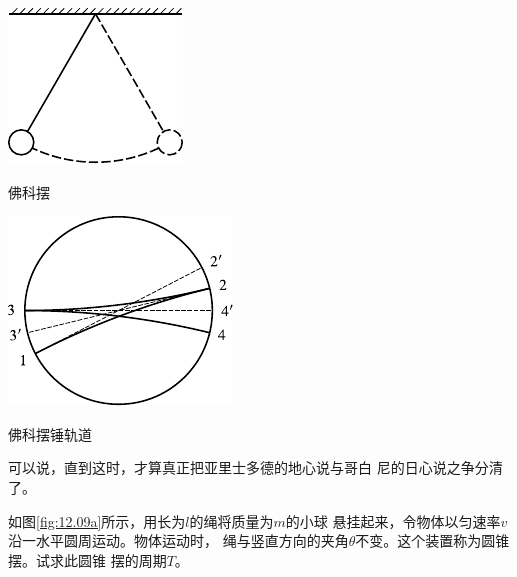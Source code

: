 \begin{figurex}[h]
    \begin{minipage}[b]{0.5\linewidth}
        \centering
        \includegraphics{figure/fig12.07}
        \caption{佛科摆}
        \label{fig:12.07}
    \end{minipage}
    \begin{minipage}[b]{0.5\linewidth}
        \centering
        \includegraphics{figure/fig12.08}
        \caption{佛科摆锤轨道}
        \label{fig:12.08}
    \end{minipage}
\end{figurex}%
\noindent
可以说，直到这时，才算真正把亚里士多德的地心说与哥白
尼的日心说之争分清了。

\example 如图\ref{fig:12.09a}所示，用长为$ l $的绳将质量为$ m $的小球
悬挂起来，令物体以匀速率$ v $沿一水平圆周运动。物体运动时，
绳与竖直方向的夹角$ \theta $不变。这个装置称为圆锥摆。试求此圆锥
摆的周期$ T $。

